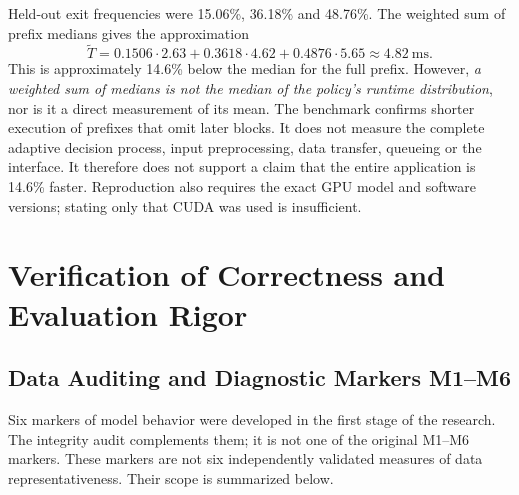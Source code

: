 \documentclass[12pt,a4paper]{article}
\begin{document}
Held-out exit frequencies were 15.06\%, 36.18\% and 48.76\%.
The weighted sum of prefix medians gives the approximation
\begin{equation}
\widetilde{T}=0.1506\cdot2.63+0.3618\cdot4.62+
0.4876\cdot5.65\approx4.82\ \mathrm{ms}.
\end{equation}
This is approximately 14.6\% below the median for the full prefix.
However, \emph{a weighted sum of medians is not the median of the policy's
runtime distribution}, nor is it a direct measurement of its mean.
The benchmark confirms shorter execution of prefixes that omit later
blocks. It does not measure the complete adaptive decision process,
input preprocessing, data transfer, queueing or the interface.
It therefore does not support a claim that the entire application
is 14.6\% faster.
Reproduction also requires the exact GPU model and software versions;
stating only that CUDA was used is insufficient.

\section{Verification of Correctness and Evaluation Rigor}

\subsection{Data Auditing and Diagnostic Markers M1--M6}

Six markers of model behavior were developed in the first stage of the research.
The integrity audit complements them; it is not one of the original
M1--M6 markers. These markers are not six independently validated measures
of data representativeness. Their scope is summarized below.
\end{document}
